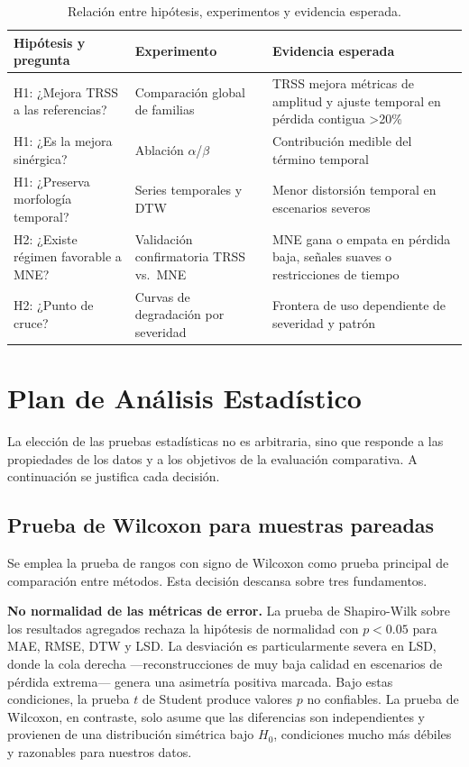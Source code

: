 \begin{table}[htbp]
\centering
\caption{Relación entre hipótesis, experimentos y evidencia esperada.}
\label{tab:hypothesis_experiments}
\small
\begin{tabular}{@{}p{3.2cm} p{3.0cm} p{5.5cm}@{}}
\toprule
Hipótesis y pregunta & Experimento & Evidencia esperada \\
\midrule
H1: ¿Mejora TRSS a las referencias? & Comparación global de familias & TRSS mejora métricas de amplitud y ajuste temporal en pérdida contigua \textgreater 20\% \\
H1: ¿Es la mejora sinérgica? & Ablación $\alpha$/$\beta$ & Contribución medible del término temporal \\
H1: ¿Preserva morfología temporal? & Series temporales y DTW & Menor distorsión temporal en escenarios severos \\
H2: ¿Existe régimen favorable a MNE? & Validación confirmatoria TRSS vs.\ MNE & MNE gana o empata en pérdida baja, señales suaves o restricciones de tiempo \\
H2: ¿Punto de cruce? & Curvas de degradación por severidad & Frontera de uso dependiente de severidad y patrón \\
\bottomrule
\end{tabular}
\end{table}

\section{Plan de Análisis Estadístico}

La elección de las pruebas estadísticas no es arbitraria, sino que responde a las propiedades de los datos y a los objetivos de la evaluación comparativa. A continuación se justifica cada decisión.

\subsection{Prueba de Wilcoxon para muestras pareadas}

Se emplea la prueba de rangos con signo de Wilcoxon como prueba principal de comparación entre métodos. Esta decisión descansa sobre tres fundamentos.

\textbf{No normalidad de las métricas de error.} La prueba de Shapiro-Wilk sobre los resultados agregados rechaza la hipótesis de normalidad con $p < 0.05$ para MAE, RMSE, DTW y LSD. La desviación es particularmente severa en LSD, donde la cola derecha —reconstrucciones de muy baja calidad en escenarios de pérdida extrema— genera una asimetría positiva marcada. Bajo estas condiciones, la prueba $t$ de Student produce valores $p$ no confiables. La prueba de Wilcoxon, en contraste, solo asume que las diferencias son independientes y provienen de una distribución simétrica bajo $H_0$, condiciones mucho más débiles y razonables para nuestros datos.

